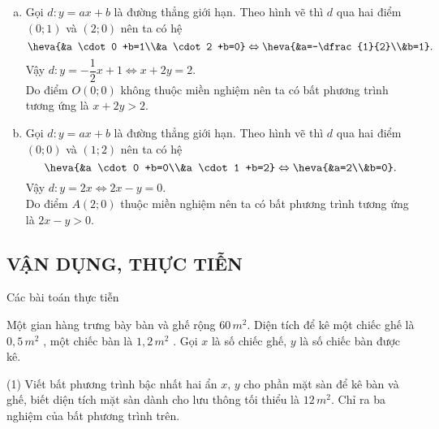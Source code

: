 \begin{vd}
{\begin{enumerate}[a)]
	Do miền nghiệm là phần bên phải trục tung nên ta có bất phương trình tương ứng là $y>0$.
	\item Gọi $d \colon y =ax+b$ là đường thẳng giới hạn. Theo hình vẽ thì $d$ qua hai điểm $(0;1)$ và $(2;0)$ nên ta có hệ
	$$\heva{&a \cdot 0 +b=1\\&a \cdot 2 +b=0} \Leftrightarrow \heva{&a=-\dfrac{1}{2}\\&b=1}.$$
	Vậy $d \colon y=-\dfrac{1}{2}x+1 \Leftrightarrow x+2y=2$.\\
	Do điểm $O(0;0)$ không thuộc miền nghiệm nên ta có bất phương trình tương ứng là $x+2y>2$.
	\item Gọi $d \colon y =ax+b$ là đường thẳng giới hạn. Theo hình vẽ thì $d$ qua hai điểm $(0;0)$ và $(1;2)$ nên ta có hệ
	$$\heva{&a \cdot 0 +b=0\\&a \cdot 1 +b=2} \Leftrightarrow \heva{&a=2\\&b=0}.$$
	Vậy $d \colon y=2x \Leftrightarrow 2x-y=0$.\\
	Do điểm $A(2;0)$ thuộc miền nghiệm nên ta có bất phương trình tương ứng là $2x-y>0$.
\end{enumerate}}
\end{vd}
\subsection{VẬN DỤNG, THỰC TIỄN}
\begin{dang}{Các bài toán thực tiễn}
\end{dang}
\begin{vd}
	Một gian hàng trưng bày bàn và ghế rộng $60\,m^2.$ Diện tích để kê một chiếc ghế là $0,5\,m^2$ , một chiếc bàn là $1,2\,m^2$ . Gọi $x$ là số chiếc ghế, $y$ là số chiếc bàn được kê.
	\begin{tasks}(1)
		\task Viết bất phương trình bậc nhất hai ẩn $x,\,y$ cho phần mặt sàn để kê bàn và ghế, biết diện tích mặt sàn dành cho lưu thông tối thiểu là $12\,m^2.$
		\task Chỉ ra ba nghiệm của bất phương trình trên.
	\end{tasks}
\end{vd}

